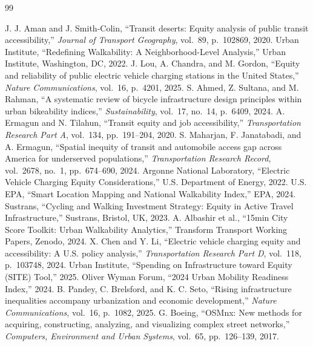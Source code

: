 \documentclass[11pt]{article}
\begin{document}
\small
\begin{thebibliography}{99}
\setlength{\itemsep}{1pt}

 J. J. Aman and J. Smith-Colin, ``Transit deserts: Equity analysis of public transit accessibility,'' \textit{Journal of Transport Geography}, vol.~89, p.~102869, 2020.
 Urban Institute, ``Redefining Walkability: A Neighborhood-Level Analysis,'' Urban Institute, Washington, DC, 2022.
 J. Lou, A. Chandra, and M. Gordon, ``Equity and reliability of public electric vehicle charging stations in the United States,'' \textit{Nature Communications}, vol.~16, p.~4201, 2025.
 S. Ahmed, Z. Sultana, and M. Rahman, ``A systematic review of bicycle infrastructure design principles within urban bikeability indices,'' \textit{Sustainability}, vol.~17, no.~14, p.~6409, 2024.
 A. Ermagun and N. Tilahun, ``Transit equity and job accessibility,'' \textit{Transportation Research Part A}, vol.~134, pp.~191--204, 2020.
 S. Maharjan, F. Janatabadi, and A. Ermagun, ``Spatial inequity of transit and automobile access gap across America for underserved populations,'' \textit{Transportation Research Record}, vol.~2678, no.~1, pp.~674--690, 2024.
 Argonne National Laboratory, ``Electric Vehicle Charging Equity Considerations,'' U.S. Department of Energy, 2022.
 U.S. EPA, ``Smart Location Mapping and National Walkability Index,'' EPA, 2024.
 Sustrans, ``Cycling and Walking Investment Strategy: Equity in Active Travel Infrastructure,'' Sustrans, Bristol, UK, 2023.
 A. Albashir et al., ``15min City Score Toolkit: Urban Walkability Analytics,'' Transform Transport Working Papers, Zenodo, 2024.
 X. Chen and Y. Li, ``Electric vehicle charging equity and accessibility: A U.S. policy analysis,'' \textit{Transportation Research Part D}, vol.~118, p.~103748, 2024.
 Urban Institute, ``Spending on Infrastructure toward Equity (SITE) Tool,'' 2025.
 Oliver Wyman Forum, ``2024 Urban Mobility Readiness Index,'' 2024.
 B. Pandey, C. Brelsford, and K. C. Seto, ``Rising infrastructure inequalities accompany urbanization and economic development,'' \textit{Nature Communications}, vol.~16, p.~1082, 2025.
 G. Boeing, ``OSMnx: New methods for acquiring, constructing, analyzing, and visualizing complex street networks,'' \textit{Computers, Environment and Urban Systems}, vol.~65, pp.~126--139, 2017.

\end{thebibliography}
\end{document}
